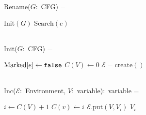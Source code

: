 
Rename($G$:~CFG) =
\begin{myalgorithmic}
\STATE $\text{Init}(G)$
 \STATE $\text{Search}(e)$ \label{line:search1}
\ENDFOR
\end{myalgorithmic}
~\\
Init($G$:~CFG) =
\begin{myalgorithmic}
 \STATE $\text{Marked}[e] \gets \texttt{false}$
\ENDFOR
{}
 \STATE $C(V) \gets 0$
\ENDFOR
\STATE $\mathcal{E} = \text{create}()$ 
\end{myalgorithmic}
~\\
Inc($\mathcal{E}$:~Environment, $V$:~variable):~variable =
\begin{myalgorithmic}
\STATE $i \gets C(V) + 1$
\STATE $C(v) \gets i$
\STATE $\mathcal{E}.\text{put}(V, V_i)$
\RETURN $V_i$
\end{myalgorithmic}
